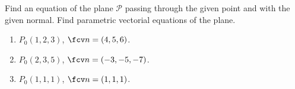 Find an equation of the plane $\mathcal P$ passing through the given point and with the given normal. Find parametric vectorial equations of the plane.

\begin{enumerate}
\item \label{problemFindPlaneFromP(1,2,3)andn(4,5,6)} $P_0(1,2,3) $,  $\fcv n= ( 4, 5, 6 )$.


\item $P_0(2,3,5) $,  $\fcv n= (-3, -5, -7 )$.

\item $P_0(1, 1, 1)$, $\fcv n= ( 1,1,1 )$.

\end{enumerate}

